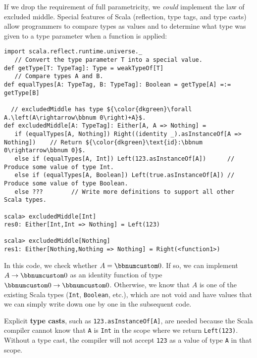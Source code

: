 If we drop the requirement of full parametricity, we \emph{could}
implement the law of excluded middle.
Special features of Scala (reflection, type tags, and type casts)
allow programmers to compare types as values and to determine what
type was given to a type parameter when a function is applied:
\begin{lstlisting}[mathescape=true]
import scala.reflect.runtime.universe._
   // Convert the type parameter T into a special value.
def getType[T: TypeTag]: Type = weakTypeOf[T]
   // Compare types A and B.
def equalTypes[A: TypeTag, B: TypeTag]: Boolean = getType[A] =:= getType[B]

  // excludedMiddle has type ${\color{dkgreen}\forall A.\left(A\rightarrow\bbnum 0\right)+A}$.
def excludedMiddle[A: TypeTag]: Either[A, A => Nothing] =
   if (equalTypes[A, Nothing]) Right((identity _).asInstanceOf[A => Nothing])    // Return ${\color{dkgreen}\text{id}:\bbnum 0\rightarrow\bbnum 0}$.
   else if (equalTypes[A, Int]) Left(123.asInstanceOf[A])      // Produce some value of type Int.
   else if (equalTypes[A, Boolean]) Left(true.asInstanceOf[A]) // Produce some value of type Boolean.
   else ???        // Write more definitions to support all other Scala types.

scala> excludedMiddle[Int]
res0: Either[Int,Int => Nothing] = Left(123)

scala> excludedMiddle[Nothing]
res1: Either[Nothing,Nothing => Nothing] = Right(<function1>) 
\end{lstlisting}
In this code, we check whether $A=\bbnum 0$. If so, we can implement
$A\rightarrow\bbnum 0$ as an identity function of type $\bbnum 0\rightarrow\bbnum 0$.
Otherwise, we know that $A$ is one of the existing Scala types (\lstinline!Int!,
\lstinline!Boolean!, etc.), which are not void and have values that
we can simply write down one by one in the subsequent code. 

Explicit \textbf{type casts}, such as \lstinline!123.asInstanceOf[A]!,
are needed because the Scala compiler cannot know that \lstinline!A!
is \lstinline!Int! in the scope where we return \lstinline!Left(123)!.
Without a type cast, the compiler will not accept \lstinline!123!
as a value of type \lstinline!A! in that scope.

